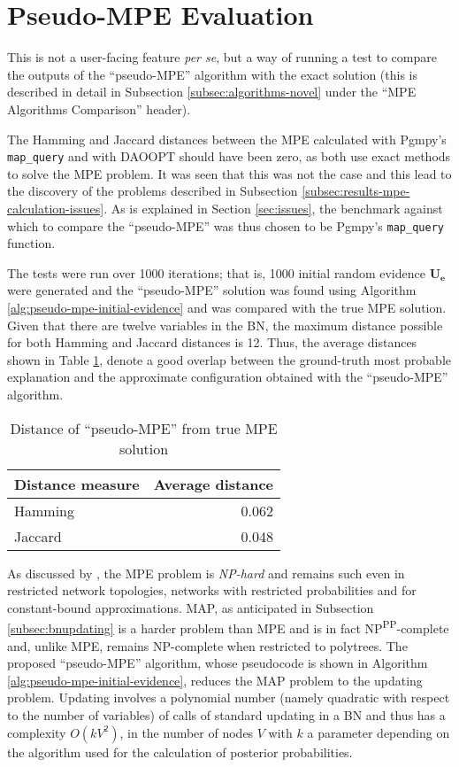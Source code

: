 \section{Pseudo-MPE Evaluation} \label{sec:pseudo-mpe-evaluation}
This is not a user-facing feature \textit{per se}, but a way of running a test to compare the outputs of the \enquote{pseudo-MPE} algorithm with the exact solution (this is described in detail in Subsection \ref{subsec:algorithms-novel} under the \enquote{MPE Algorithms Comparison} header).

The Hamming and Jaccard distances between the MPE calculated with Pgmpy's \texttt{map\_query} and with DAOOPT should have been zero, as both use exact methods to solve the MPE problem.
It was seen that this was not the case and this lead to the discovery of the problems described in Subsection \ref{subsec:results-mpe-calculation-issues}.
As is explained in Section \ref{sec:issues}, the benchmark against which to compare the \enquote{pseudo-MPE} was thus chosen to be Pgmpy's \texttt{map\_query} function.

The tests were run over 1000 iterations; that is, 1000 initial random evidence $\boldsymbol{U_e}$ were generated and the \enquote{pseudo-MPE} solution was found using Algorithm \ref{alg:pseudo-mpe-initial-evidence} and was compared with the true MPE solution.
Given that there are twelve variables in the BN, the maximum distance possible for both Hamming and Jaccard distances is 12.
Thus, the average distances shown in Table \ref{tab:mpe-vs-pseudo-results}, denote a good overlap between the ground-truth most probable explanation and the approximate configuration obtained with the \enquote{pseudo-MPE} algorithm.

\begin{table}[h]
	\centering
	\caption{Distance of \enquote{pseudo-MPE} from true MPE solution}
	\begin{tabularx}{0.5\textwidth}{Xr}
		\toprule
		Distance measure & Average distance  \\
		\midrule	
		Hamming & 0.062 \\
		Jaccard & 0.048 \\
		\bottomrule
		\end{tabularx}
	\label{tab:mpe-vs-pseudo-results}
\end{table}

As discussed by \citet{gamez2013advances}, the MPE problem is \textit{NP-hard} \citep{kwisthout2011most} and remains such even in restricted network topologies, networks with restricted probabilities and for constant-bound approximations.
MAP, as anticipated in Subsection \ref{subsec:bnupdating} is a harder problem than MPE and is in fact NP\textsuperscript{PP}-complete and, unlike MPE, remains NP-complete when restricted to polytrees.
The proposed \enquote{pseudo-MPE} algorithm, whose pseudocode is shown in Algorithm \ref{alg:pseudo-mpe-initial-evidence}, reduces the MAP problem to the updating problem.
Updating involves a polynomial number (namely quadratic with respect to the number of variables) of calls of standard updating in a BN and thus has a complexity $O(kV^2)$, in the number of nodes $V$ with $k$ a parameter depending on the algorithm used for the calculation of posterior probabilities.

